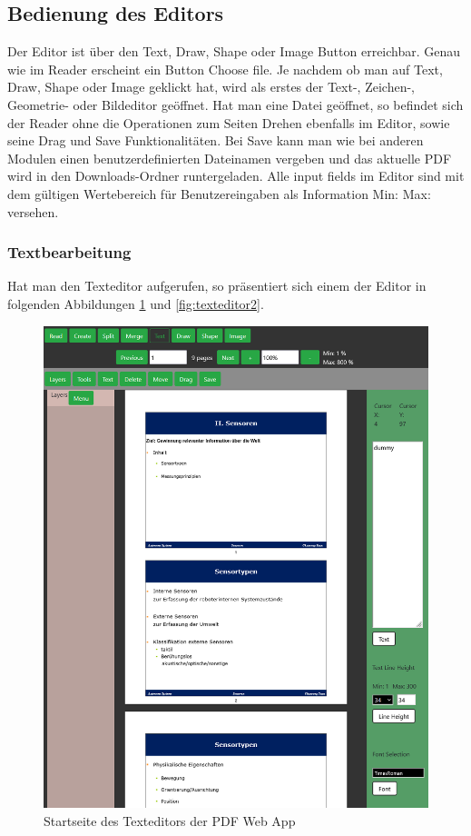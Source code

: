 \subsection{Bedienung des Editors}
Der Editor ist über den Text, Draw, Shape oder Image Button erreichbar. Genau wie im Reader erscheint ein Button Choose file. Je nachdem ob man auf Text, Draw, Shape oder Image geklickt hat, wird als erstes der Text-, Zeichen-, Geometrie- oder Bildeditor geöffnet. Hat man eine Datei geöffnet, so befindet sich der Reader ohne die Operationen zum Seiten Drehen ebenfalls im Editor, sowie seine Drag und Save Funktionalitäten. Bei Save kann man wie bei anderen Modulen einen benutzerdefinierten Dateinamen vergeben und das aktuelle PDF wird in den Downloads-Ordner runtergeladen. Alle input fields im Editor sind mit dem gültigen Wertebereich für Benutzereingaben als Information Min: Max: versehen. 

\subsubsection{Textbearbeitung}
Hat man den Texteditor aufgerufen, so präsentiert sich einem der Editor in folgenden Abbildungen \ref{fig:texteditor} und \ref{fig:texteditor2}.

\begin{figure}[!htbp]
	\centering
	\includegraphics[width=1\textwidth]{"images/texteditor.png"}
	\caption{Startseite des Texteditors der PDF Web App}
	\label{fig:texteditor}
\end{figure}

